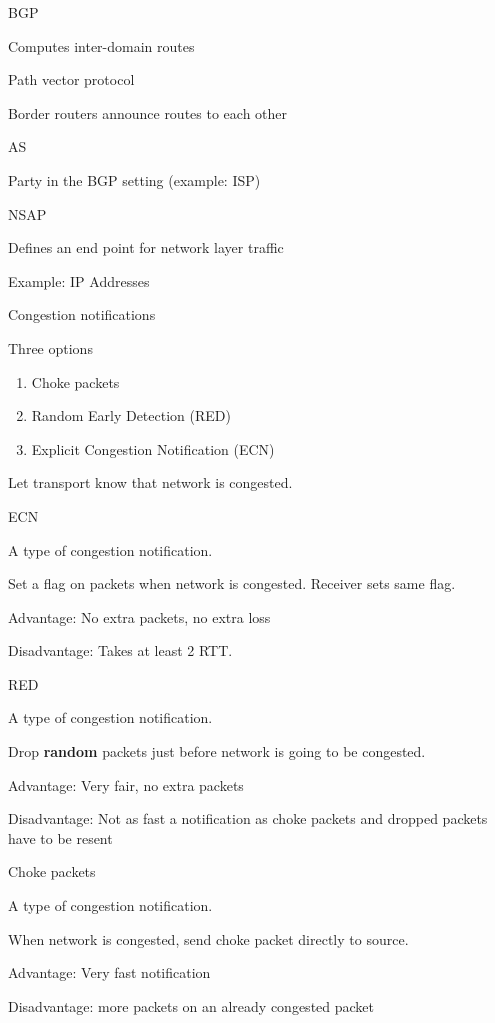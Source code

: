 \documentclass[main.tex]{subfiles}
\begin{document}
\begin{card}{BGP}
\item Computes inter-domain routes
\item Path vector protocol
\item Border routers announce routes to each other
\end{card}

\begin{card}{AS}
\item Party in the BGP setting (example: ISP)
\end{card}

\begin{card}{NSAP}
\item Defines an end point for network layer traffic
\item Example: IP Addresses
\end{card}

\begin{card}{Congestion notifications}
\item Three options
    \begin{enumerate}
        \item Choke packets
        \item Random Early Detection (RED)
        \item Explicit Congestion Notification (ECN)
    \end{enumerate}
\item Let transport know that network is congested.
\end{card}

\begin{card}{ECN}
\item A type of congestion notification.
\item Set a flag on packets when network is congested. Receiver sets same flag.
\item Advantage: No extra packets, no extra loss
\item Disadvantage: Takes at least 2 RTT.
\end{card}

\begin{card}{RED}
\item A type of congestion notification.
\item Drop \textbf{random} packets just before network is going to be congested.
\item Advantage: Very fair, no extra packets
\item Disadvantage: Not as fast a notification as choke packets and dropped packets have to be resent
\end{card}

\begin{card}{Choke packets}
\item A type of congestion notification.
\item When network is congested, send choke packet directly to source.
\item Advantage: Very fast notification
\item Disadvantage: more packets on an already congested packet
\end{card}
\end{document}
